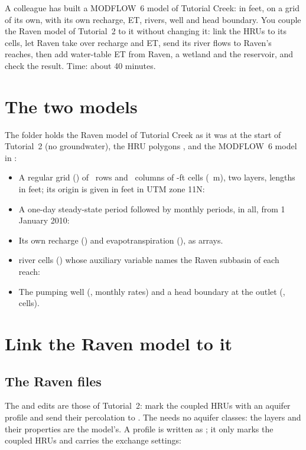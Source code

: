 
\begin{goal}
A colleague has built a MODFLOW~6 model of Tutorial Creek: in feet, on a grid of its own, with its own recharge, ET,
rivers, well and head boundary. You couple the Raven model of Tutorial~2 to it without changing it: link the HRUs to its
cells, let Raven take over recharge and ET, send its river flows to Raven's reaches, then add water-table ET from Raven, a
wetland and the reservoir, and check the result. Time: about 40 minutes.
\end{goal}

\section{The two models}
The folder holds the Raven model of Tutorial Creek as it was at the start of Tutorial~2 (no groundwater), the HRU polygons
, and the MODFLOW~6 model in :
\begin{itemize}
\item A regular grid () of ~rows and ~columns of -ft cells
      (~m), two layers, lengths in feet; its origin is given in feet in UTM zone 11N:
\item A one-day steady-state period followed by monthly periods,  in all, from 1 January 2010:
\item Its own recharge () and evapotranspiration (), as arrays.
\item {} river cells () whose auxiliary variable  names the Raven subbasin of each reach:
\item The pumping well (, monthly rates) and a head boundary at the outlet (,  cells).
\end{itemize}

\section{Link the Raven model to it}
\subsection{The Raven files}
The  and  edits are those of Tutorial~2: mark the coupled HRUs with an aquifer profile and send their
percolation to .
The  needs no aquifer classes: the layers and their properties are the model's. A profile is written as
; it only marks the coupled HRUs and carries the exchange settings:

